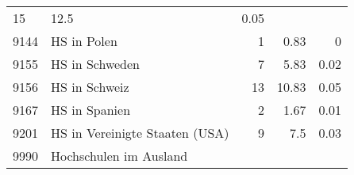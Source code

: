 \begin{longtable}{lXrrr}
       \num{15} &
       \num[round-mode=places,round-precision=2]{12.5} &
         \num[round-mode=places,round-precision=2]{0.05} \\

     9144 &
     \multicolumn{1}{X}{ HS in Polen   } &


       \num{1} &
       \num[round-mode=places,round-precision=2]{0.83} &
         \num[round-mode=places,round-precision=2]{0} \\

     9155 &
     \multicolumn{1}{X}{ HS in Schweden   } &


       \num{7} &
       \num[round-mode=places,round-precision=2]{5.83} &
         \num[round-mode=places,round-precision=2]{0.02} \\

     9156 &
     \multicolumn{1}{X}{ HS in Schweiz   } &


       \num{13} &
       \num[round-mode=places,round-precision=2]{10.83} &
         \num[round-mode=places,round-precision=2]{0.05} \\

     9167 &
     \multicolumn{1}{X}{ HS in Spanien   } &


       \num{2} &
       \num[round-mode=places,round-precision=2]{1.67} &
         \num[round-mode=places,round-precision=2]{0.01} \\

     9201 &
     \multicolumn{1}{X}{ HS in Vereinigte Staaten (USA)   } &


       \num{9} &
       \num[round-mode=places,round-precision=2]{7.5} &
         \num[round-mode=places,round-precision=2]{0.03} \\

     9990 &
     \multicolumn{1}{X}{ Hochschulen im Ausland   } &



\end{longtable}
